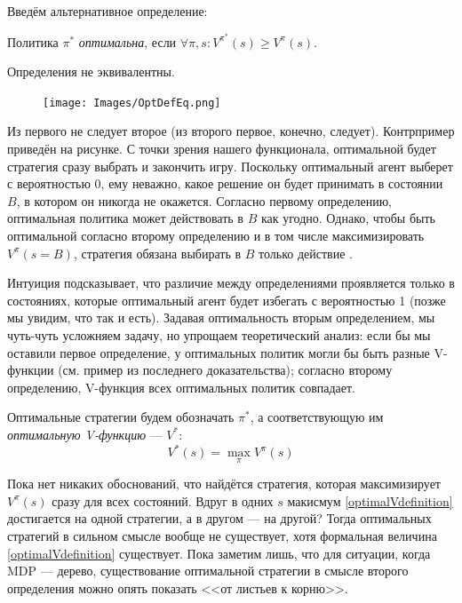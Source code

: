 Введём альтернативное определение:

\begin{definition} 
Политика $\pi^*$ \emph{оптимальна}, если $\forall \pi, s \colon V^{\pi^*}(s) \ge V^\pi(s)$.
\end{definition}

\begin{theorem}
Определения не эквивалентны.

\begin{figure}
\centering
\vspace{-0.6cm}
\texttt{[image: Images/OptDefEq.png]}
\end{figure}
\beginproof{}
Из первого не следует второе (из второго первое, конечно, следует). Контрпример приведён на рисунке. С точки зрения нашего функционала, оптимальной будет стратегия сразу выбрать  и закончить игру. Поскольку оптимальный агент выберет  с вероятностью 0, ему неважно, какое решение он будет принимать в состоянии $B$, в котором он никогда не окажется. Согласно первому определению, оптимальная политика может действовать в $B$ как угодно. Однако, чтобы быть оптимальной согласно второму определению и в том числе максимизировать $V^\pi(s = B)$, стратегия обязана выбирать в $B$ только действие . \QED
\end{theorem}

Интуиция подсказывает, что различие между определениями проявляется только в состояниях, которые оптимальный агент будет избегать с вероятностью 1 (позже мы увидим, что так и есть). Задавая оптимальность вторым определением, мы чуть-чуть усложняем задачу, но упрощаем теоретический анализ: если бы мы оставили первое определение, у оптимальных политик могли бы быть разные V-функции (см. пример из последнего доказательства); согласно второму определению, V-функция всех оптимальных политик совпадает. 
\begin{definition}
Оптимальные стратегии будем обозначать $\pi^*$, а соответствующую им \emph{оптимальную V-функцию} --- $V^*$:
\begin{equation}\label{optimalVdefinition}
V^*(s) = \max_\pi V^{\pi}(s)
\end{equation}
\end{definition}

Пока нет никаких обоснований, что найдётся стратегия, которая максимизирует $V^{\pi}(s)$ сразу для всех состояний. Вдруг в одних $s$ макисмум \eqref{optimalVdefinition} достигается на одной стратегии, а в другом --- на другой? Тогда оптимальных стратегий в сильном смысле вообще не существует, хотя формальная величина \eqref{optimalVdefinition} существует. Пока заметим лишь, что для ситуации, когда MDP --- дерево, существование оптимальной стратегии в смысле второго определения можно опять показать <<от листьев к корню>>. 

